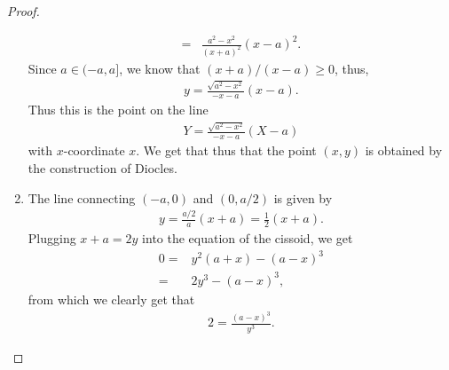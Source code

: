 \begin{proof}
\begin{enumerate}
\begin{align*}
        =& \frac{a^2 - x^2}{(x+a)^2}(x-a)^2.    
    \end{align*}
    Since $a\in (-a,a]$, we know that $(x+a)/(x-a)\geq 0$, thus,
    \begin{align*}
        y = \frac{\sqrt{a^2 - x^2}}{-x-a}(x-a).
    \end{align*}
    Thus this is the point on the line
    \begin{align*}
        Y = \frac{\sqrt{a^2 - x^2}}{-x-a}(X-a)
    \end{align*}
    with $x$-coordinate $x$. 
    We get that thus that the point $(x,y)$ is obtained by the construction of Diocles.
    \item The line connecting $(-a,0)$ and $(0,a/2)$ is given by
    \begin{align*}
        y = \frac{a/2}{a}(x+a) = \frac{1}{2}(x+a).
    \end{align*}
    Plugging $x+a = 2y$ into the equation of the cissoid, we get
    \begin{align*}
        0
        =& y^2 (a+x) - (a-x)^3\\
        =& 2y^3 - (a-x)^3,
    \end{align*}
    from which we clearly get that
    \begin{align*}
        2 = \frac{(a-x)^3}{y^3}.
    \end{align*}
\end{enumerate}
\end{proof}

